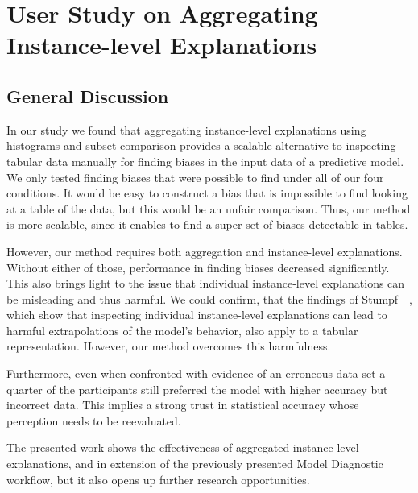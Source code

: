 \chapter{User Study on Aggregating Instance-level Explanations}
\label{chap:aggexplain}


\section{General Discussion}
In our study we found that aggregating instance-level explanations using histograms and subset comparison provides a scalable alternative to inspecting tabular data manually for finding biases in the input data of a predictive model.
We only tested finding biases that were possible to find under all of our four conditions.
It would be easy to construct a bias that is impossible to find looking at a table of the data, but this would be an unfair comparison.
Thus, our method is more scalable, since it enables to find a super-set of biases detectable in tables.

However, our method requires both aggregation and instance-level explanations.
Without either of those, performance in finding biases decreased significantly.
This also brings light to the issue that individual instance-level explanations can be misleading and thus harmful.
We could confirm, that the findings of Stumpf~\etal~\cite{harmful}, which show that inspecting individual instance-level explanations can lead to harmful extrapolations of the model's behavior, also apply to a tabular representation.
However, our method overcomes this harmfulness.

Furthermore, even when confronted with evidence of an erroneous data set a quarter of the participants still preferred the model with higher accuracy but incorrect data.
This implies a strong trust in statistical accuracy whose perception needs to be reevaluated.

The presented work shows the effectiveness of aggregated instance-level explanations, and in extension of the previously presented Model Diagnostic workflow, but it also opens up further research opportunities.
